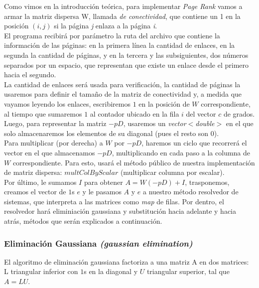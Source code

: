 		Como vimos en la introducción teórica, para implementar \textit{Page Rank} vamos a armar la matriz dispersa W, llamada \textit{de conectividad}, que contiene un 1 en la posición $(i,j)$ si la página \textit{j} enlaza a la página \textit{i}. \\

		El programa recibirá por parámetro la ruta del archivo que contiene la información de las páginas: en la primera línea la cantidad de enlaces, en la segunda la cantidad de páginas, y en la tercera y las subsiguientes, dos números separados por un espacio, que representan que existe un enlace desde el primero hacia el segundo. \\

		La cantidad de enlaces será usada para verificación, la cantidad de páginas la usaremos para definir el tamaño de la matriz de conectividad y, a medida que vayamos leyendo los enlaces, escribiremos $1$ en la posición de $W$ correspondiente, al tiempo que sumaremos $1$ al contador ubicado en la fila $i$ del vector $c$ de grados. \\

		Luego, para representar la matriz $-pD$, usaremos un \textit{vector$<$double$>$} en el que solo almacenaremos los elementos de su diagonal (pues el resto son $0$). \\

		Para multiplicar (por derecha) a $W$ por $-pD$, haremos un ciclo que recorrerá el vector en el que almacenamos $-pD$, multiplicando en cada paso a la columna de $W$ correspondiente. Para esto, usará el método público de nuestra implementación de matriz dispersa: $multColByScalar$ (multiplicar columna por escalar). \\

		Por último, le sumamos $I$ para obtener $A = W(-pD) + I$, trasponemos, creamos el vector de $1$s $e$ y le pasamos $A$ y $e$ a nuestro método resolvedor de sistemas, que interpreta a las matrices como \textit{map} de filas. Por dentro, el resolvedor hará eliminiación gaussiana y substitución hacia adelante y hacia atrás, métodos que serán explicados a continuación. \\

		\subsubsection{Eliminación Gaussiana \textit{(gaussian elimination)}}

			El algoritmo de eliminación gaussiana factoriza a una matriz A en dos matrices: L triangular inferior con $1$s en la diagonal y $U$ triangular superior, tal que $A = LU$. \\

